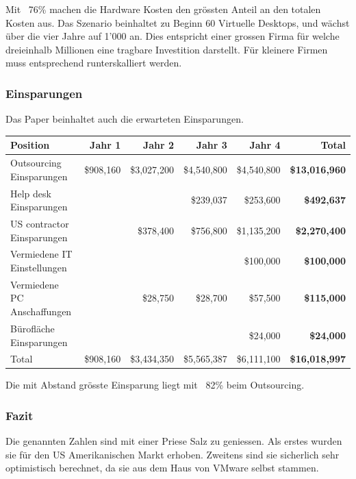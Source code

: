 Mit ~76\% machen die Hardware Kosten den grössten Anteil an den totalen Kosten aus.
Das Szenario beinhaltet zu Beginn 60 Virtuelle Desktops, und wächst über die vier Jahre auf 1'000 an. Dies entspricht einer grossen Firma für welche dreieinhalb Millionen eine tragbare Investition darstellt. Für kleinere Firmen muss entsprechend runterskalliert werden.

\subsubsection{Einsparungen}
Das Paper beinhaltet auch die erwarteten Einsparungen.

\begin{table}[H]
	\centering
	\small\renewcommand{\arraystretch}{1.4}
	\begin{tabularx}{\textwidth}{X | r | r | r | r | r}
		\hline
		\rowcolor{tableheadcolor}
		\textbf{Position} & \textbf{Jahr 1} & \textbf{Jahr 2} & \textbf{Jahr 3} & \textbf{Jahr 4} & \textbf{Total} \\
		\hline
		Outsourcing Einsparungen & \$908,160 & \$3,027,200 & \$4,540,800 & \$4,540,800 & \textbf{\$13,016,960} \\
		Help desk Einsparungen &  &  & \$239,037 & \$253,600 & \textbf{\$492,637} \\
		US contractor Einsparungen &  & \$378,400 & \$756,800 & \$1,135,200 & \textbf{\$2,270,400} \\
		Vermiedene IT Einstellungen &  &  &  & \$100,000 & \textbf{\$100,000} \\
		Vermiedene PC Anschaffungen &  & \$28,750 & \$28,700 & \$57,500 & \textbf{\$115,000} \\
		Bürofläche Einsparungen &  &  &  & \$24,000 & \textbf{\$24,000} \\
		\hline
		\rowcolor{tableheadcolor}
		Total & \$908,160 & \$3,434,350 & \$5,565,387 & \$6,111,100 & \textbf{\$16,018,997} \\
	\end{tabularx}
\end{table}

Die mit Abstand grösste Einsparung liegt mit ~82\% beim Outsourcing.

\subsubsection{Fazit}
Die genannten Zahlen sind mit einer Priese Salz zu geniessen. Als erstes wurden sie für den US Amerikanischen Markt erhoben. Zweitens sind sie sicherlich sehr optimistisch berechnet, da sie aus dem Haus von VMware selbst stammen.

